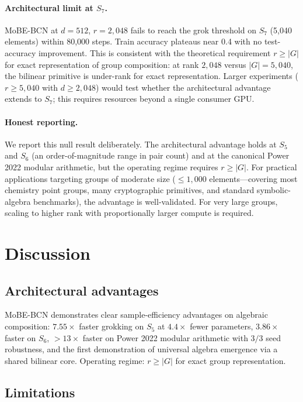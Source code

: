 \documentclass[11pt]{article}
\begin{document}
\paragraph{Architectural limit at $S_7$.}
MoBE-BCN at $d = 512$, $r = 2{,}048$ fails to reach the grok threshold
on $S_7$ (5,040 elements) within 80,000 steps. Train accuracy
plateaus near 0.4 with no test-accuracy improvement. This is
consistent with the theoretical requirement $r \geq |G|$ for exact
representation of group composition: at rank $2{,}048$ versus
$|G| = 5{,}040$, the bilinear primitive is under-rank for exact
representation. Larger experiments ($r \geq 5{,}040$ with $d \geq 2{,}048$)
would test whether the architectural advantage extends to $S_7$;
this requires resources beyond a single consumer GPU.

\paragraph{Honest reporting.}
We report this null result deliberately. The architectural advantage
holds at $S_5$ and $S_6$ (an order-of-magnitude range in pair count)
and at the canonical Power 2022 modular arithmetic, but the operating
regime requires $r \geq |G|$. For practical applications targeting
groups of moderate size ($\leq\! 1{,}000$ elements---covering most
chemistry point groups, many cryptographic primitives, and standard
symbolic-algebra benchmarks), the advantage is well-validated. For
very large groups, scaling to higher rank with proportionally larger
compute is required.

\section{Discussion}
\label{sec:discussion}

\subsection{Architectural advantages}
MoBE-BCN demonstrates clear sample-efficiency advantages on algebraic
composition: $7.55\times$ faster grokking on $S_5$ at $4.4\times$
fewer parameters, $3.86\times$ faster on $S_6$, $>13\times$ faster on
Power 2022 modular arithmetic with $3/3$ seed robustness, and the
first demonstration of universal algebra emergence via a shared
bilinear core. Operating regime: $r \geq |G|$ for exact group
representation.

\subsection{Limitations}
\end{document}
